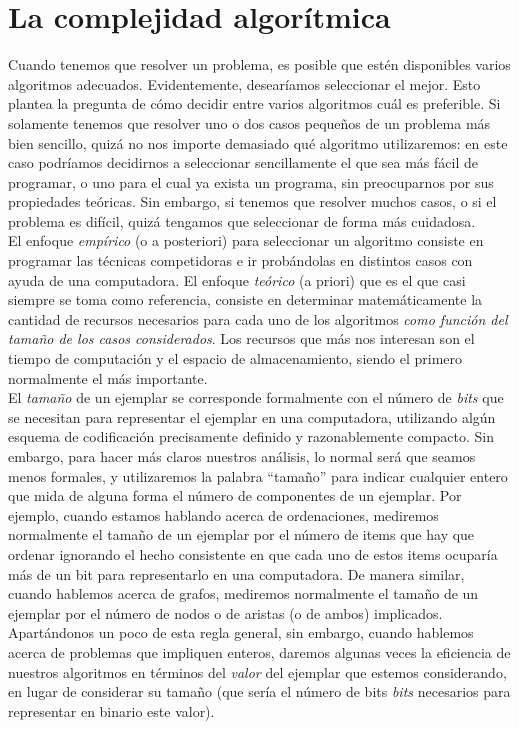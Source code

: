 \chapter{La complejidad algorítmica}
\label{chap:notacion-asintotica}

Cuando tenemos que resolver un problema, es posible que estén disponibles varios algoritmos adecuados. Evidentemente, desearíamos seleccionar el mejor. Esto plantea la pregunta de cómo decidir entre varios algoritmos cuál es preferible. Si solamente tenemos que resolver uno o dos casos pequeños de un problema más bien sencillo, quizá no nos importe demasiado qué algoritmo utilizaremos: en este caso podríamos decidirnos a seleccionar sencillamente el que sea más fácil de programar, o uno para el cual ya exista un programa, sin preocuparnos por sus propiedades teóricas. Sin embargo, si tenemos que resolver muchos casos, o si el problema es difícil, quizá tengamos que seleccionar de forma más cuidadosa.\\

El enfoque \emph{empírico} (o a posteriori) para seleccionar un algoritmo consiste en programar las técnicas competidoras e ir probándolas en distintos casos con ayuda de una computadora. El enfoque \emph{teórico} (a priori) que es el que casi siempre se toma como referencia, consiste en determinar matemáticamente la cantidad de recursos necesarios para cada uno de los algoritmos \emph{como función del tamaño de los casos considerados}. Los recursos que más nos interesan son el tiempo de computación y el espacio de almacenamiento, siendo el primero normalmente el más importante. \\

El \emph{tamaño} de un ejemplar se corresponde formalmente con el número de \emph{bits} que se necesitan para representar el ejemplar en una computadora, utilizando algún esquema de codificación precisamente definido y razonablemente compacto. Sin embargo, para hacer más claros nuestros análisis, lo normal será que seamos menos formales, y utilizaremos la palabra ``tamaño'' para indicar cualquier entero que mida de alguna forma el número de componentes de un ejemplar. Por ejemplo, cuando estamos hablando acerca de ordenaciones, mediremos normalmente el tamaño de un ejemplar por el número de items que hay que ordenar ignorando el hecho consistente en que cada uno de estos items ocuparía más de un bit para representarlo en una computadora. De manera similar, cuando hablemos acerca de grafos, mediremos normalmente el tamaño de un ejemplar por el número de nodos o de aristas (o de ambos) implicados. Apartándonos un poco de esta regla general, sin embargo, cuando hablemos acerca de problemas que impliquen enteros, daremos algunas veces la eficiencia de nuestros algoritmos en términos del \emph{valor} del ejemplar que estemos considerando, en lugar de considerar su tamaño (que sería el número de bits \emph{bits} necesarios para representar en binario este valor).\\

